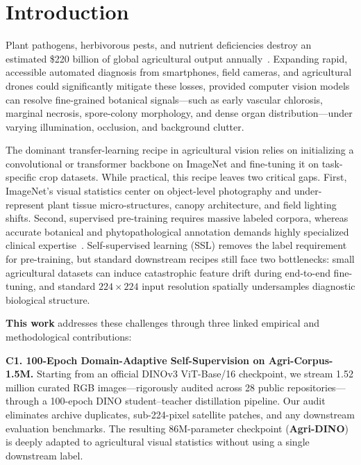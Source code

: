 \documentclass[10pt,twocolumn,letterpaper]{article}
\begin{document}
\section{Introduction}

Plant pathogens, herbivorous pests, and nutrient deficiencies destroy an estimated \$220 billion of global agricultural output annually~\cite{savary2019global}. Expanding rapid, accessible automated diagnosis from smartphones, field cameras, and agricultural drones could significantly mitigate these losses, provided computer vision models can resolve fine-grained botanical signals—such as early vascular chlorosis, marginal necrosis, spore-colony morphology, and dense organ distribution—under varying illumination, occlusion, and background clutter.

The dominant transfer-learning recipe in agricultural vision relies on initializing a convolutional or transformer backbone on ImageNet and fine-tuning it on task-specific crop datasets. While practical, this recipe leaves two critical gaps. First, ImageNet's visual statistics center on object-level photography and under-represent plant tissue micro-structures, canopy architecture, and field lighting shifts. Second, supervised pre-training requires massive labeled corpora, whereas accurate botanical and phytopathological annotation demands highly specialized clinical expertise~\cite{mohanty2016using}. Self-supervised learning (SSL) removes the label requirement for pre-training, but standard downstream recipes still face two bottlenecks: small agricultural datasets can induce catastrophic feature drift during end-to-end fine-tuning, and standard $224\times224$ input resolution spatially undersamples diagnostic biological structure.

\noindent\textbf{This work} addresses these challenges through three linked empirical and methodological contributions:

\noindent\textbf{C1. 100-Epoch Domain-Adaptive Self-Supervision on Agri-Corpus-1.5M.}
Starting from an official DINOv3 ViT-Base/16 checkpoint, we stream \num{1.52} million curated RGB images—rigorously audited across 28 public repositories—through a 100-epoch DINO student--teacher distillation pipeline. Our audit eliminates archive duplicates, sub-224-pixel satellite patches, and any downstream evaluation benchmarks. The resulting 86M-parameter checkpoint (\textbf{Agri-DINO}) is deeply adapted to agricultural visual statistics without using a single downstream label.
\end{document}
